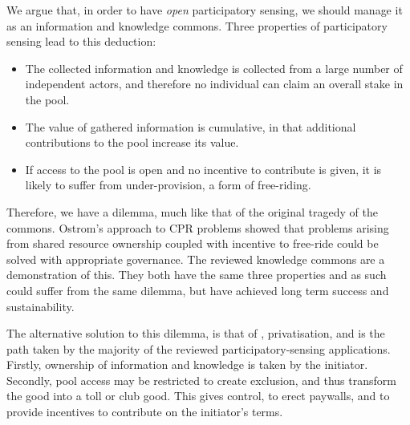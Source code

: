 We argue that, in order to have \emph{open} participatory sensing, we should manage it as an information and knowledge commons. Three properties of participatory sensing lead to this deduction:

\begin{itemize}
\item The collected information and knowledge is collected from a large number of independent actors, and therefore no individual can claim an overall stake in the pool.
\item The value of gathered information is cumulative, in that additional contributions to the pool increase its value.
\item If access to the pool is open and no incentive to contribute is given, it is likely to suffer from under-provision, a form of free-riding. 
\end{itemize}

Therefore, we have a dilemma, much like that of the original tragedy of the
commons. Ostrom's approach to \ac{CPR} problems showed that problems arising
from shared resource ownership coupled with incentive to free-ride could be
solved with appropriate governance. The reviewed knowledge commons are a
demonstration of this. They both have the same three properties and as such
could suffer from the same dilemma, but have achieved long term success and
sustainability.

The alternative solution to this dilemma, is that of \citet{Hardin1968},
privatisation, and is the path taken by the majority of the reviewed
participatory-sensing applications. Firstly, ownership of information and
knowledge is taken by the initiator. Secondly, pool access may be restricted
to create exclusion, and thus transform the good into a toll or club good.
This gives control, to erect paywalls, and to provide incentives to contribute
on the initiator's terms.


